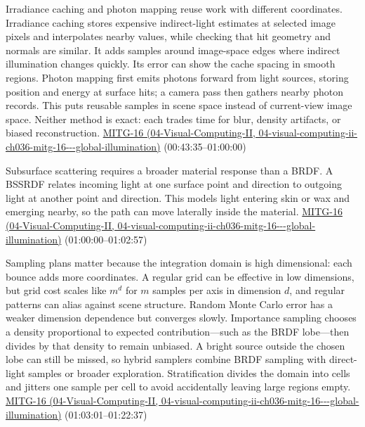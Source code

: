 Irradiance caching and photon mapping reuse work with different coordinates. Irradiance caching stores expensive indirect-light estimates at selected image pixels and interpolates nearby values, while checking that hit geometry and normals are similar. It adds samples around image-space edges where indirect illumination changes quickly. Its error can show the cache spacing in smooth regions. Photon mapping first emits photons forward from light sources, storing position and energy at surface hits; a camera pass then gathers nearby photon records. This puts reusable samples in scene space instead of current-view image space. Neither method is exact: each trades time for blur, density artifacts, or biased reconstruction. \href{../04-Visual-Computing-II/main.pdf\#nameddest=04-visual-computing-ii-ch036-mitg-16---global-illumination}{MITG-16 (04-Visual-Computing-II, 04-visual-computing-ii-ch036-mitg-16-\/-\/-global-illumination)} (00:43:35--01:00:00)

Subsurface scattering requires a broader material response than a BRDF. A BSSRDF relates incoming light at one surface point and direction to outgoing light at another point and direction. This models light entering skin or wax and emerging nearby, so the path can move laterally inside the material. \href{../04-Visual-Computing-II/main.pdf\#nameddest=04-visual-computing-ii-ch036-mitg-16---global-illumination}{MITG-16 (04-Visual-Computing-II, 04-visual-computing-ii-ch036-mitg-16-\/-\/-global-illumination)} (01:00:00--01:02:57)

Sampling plans matter because the integration domain is high dimensional: each bounce adds more coordinates. A regular grid can be effective in low dimensions, but grid cost scales like \(m^d\) for \(m\) samples per axis in dimension \(d\), and regular patterns can alias against scene structure. Random Monte Carlo error has a weaker dimension dependence but converges slowly. Importance sampling chooses a density proportional to expected contribution---such as the BRDF lobe---then divides by that density to remain unbiased. A bright source outside the chosen lobe can still be missed, so hybrid samplers combine BRDF sampling with direct-light samples or broader exploration. Stratification divides the domain into cells and jitters one sample per cell to avoid accidentally leaving large regions empty. \href{../04-Visual-Computing-II/main.pdf\#nameddest=04-visual-computing-ii-ch036-mitg-16---global-illumination}{MITG-16 (04-Visual-Computing-II, 04-visual-computing-ii-ch036-mitg-16-\/-\/-global-illumination)} (01:03:01--01:22:37)

